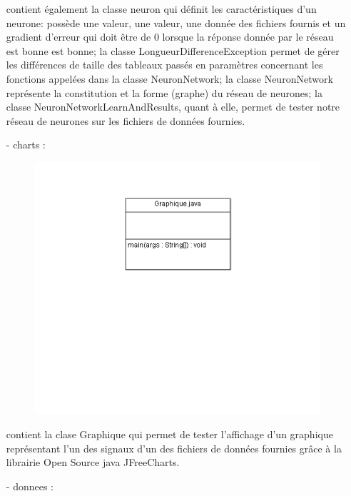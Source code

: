 \begin{itemize}
	contient également la classe neuron qui définit les caractéristiques d'un neurone: possède une valeur, une valeur, une donnée des fichiers fournis et un gradient d'erreur qui doit être de 0 lorsque la réponse donnée par le réseau est bonne est bonne;
	la classe LongueurDifferenceException permet de gérer les différences de taille des tableaux passés en paramètres concernant les fonctions appelées dans la classe NeuronNetwork;
	la classe NeuronNetwork représente la constitution et la forme (graphe) du réseau de neurones;
	la classe NeuronNetworkLearnAndResults, quant à elle, permet de tester notre réseau de neurones sur les fichiers de données fournies.
	\item [-] charts :
	 \begin{figure}[h!]
			\centering
		    \includegraphics []{../diagramme_classes/charts.png} \\
			\label{fig_graph}
			\end{figure}
	 contient la clase Graphique qui permet de tester l'affichage d'un graphique représentant l'un des signaux d'un des fichiers de données fournies grâce à la librairie Open Source java JFreeCharts.
	\item [-] donnees : 
		\begin{figure}[h!]

\end{figure}
\end{itemize}
